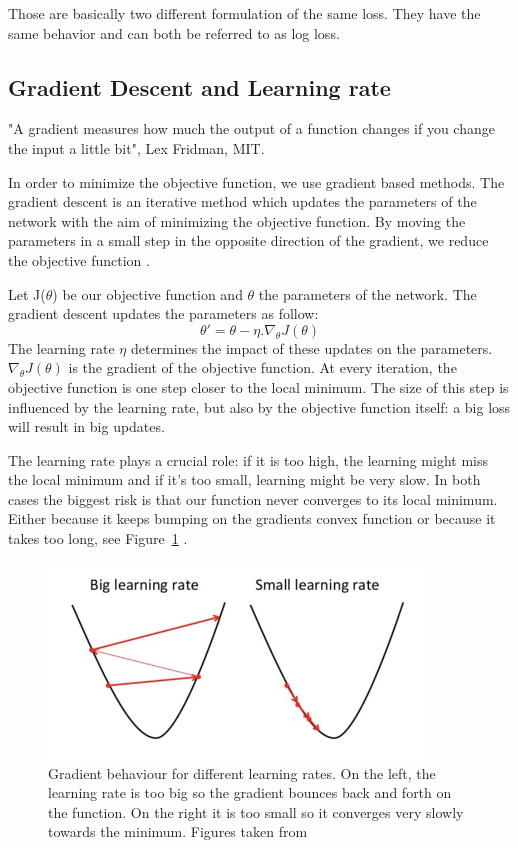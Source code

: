 Those are basically two different formulation of the same loss. They have the same behavior and can both be referred to as log loss. 
\subsection{Gradient Descent and Learning rate} \label{sec:grad_lr}
 "A gradient measures how much the output of a function changes if you change the input a little bit", Lex Fridman, MIT. 


In order to minimize the objective function, we use gradient based methods. The gradient descent is an iterative method which updates the parameters of the network with the aim of minimizing the objective function. By moving the parameters in a small step in the opposite direction of the gradient, we reduce the objective function \cite{cs231n}. 

Let J(\(\theta\)) be our objective function and \(\theta\) the parameters of the network. The gradient descent updates the parameters as follow: \[\theta' = \theta - \eta . \nabla_\theta J(\theta) \] The learning rate \(\eta\) determines the impact of these updates on the parameters. \(\nabla_\theta J(\theta) \) is the gradient of the objective function. At every iteration, the objective function is one step closer to the local minimum. The size of this step is influenced by the learning rate, but also by the objective function itself: a big loss will result in big updates. 


The learning rate plays a crucial role: if it is too high, the learning might miss the local minimum and if it's too small, learning might be very slow. In both cases the biggest risk is that our function never converges to its local minimum. Either because it keeps bumping on the gradients convex function or because it takes too long, see Figure~\ref{fig:LR}  \cite{cs231n}.  
\begin{figure}[!htp]
    \centering
        \includegraphics[width=0.9\textwidth]{figures/02-LR}
        \caption[Gradient behaviour for different learning rates]{Gradient behaviour for different learning rates. On the left, the learning rate is too big so the gradient bounces back and forth on the function. On the right it is too small so it converges very slowly towards the minimum. Figures taken from \cite{gradient} }\label{fig:LR}
\end{figure}

